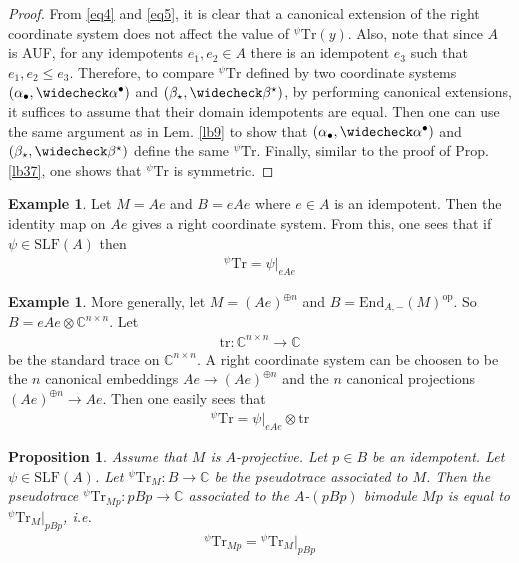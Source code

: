 \documentclass[11pt,b5paper,notitlepage]{article}
\theoremstyle{definition}
\newtheorem{eg}[df]{Example}
\theoremstyle{plain}
\newtheorem{pp}[df]{Proposition}
\newcommand{\wch}{\widecheck}
\newcommand{\Tr}{\mathrm{Tr}}
\newcommand{\End}{\mathrm{End}} %
\newcommand{\opp}{\mathrm{op}}
\newcommand{\blt}{\bullet}
\newcommand{\Cbb}{\mathbb C}
\newcommand{\SLF}{\mathrm{SLF}}
\newcommand{\trc}{\mathrm{tr}}
\numberwithin{equation}{section}
\begin{document}
\begin{proof}
From \eqref{eq4} and \eqref{eq5}, it is clear that a canonical extension of the right coordinate system does not affect the value of ${^\psi}\Tr(y)$. Also, note that since $A$ is AUF, for any idempotents $e_1,e_2\in A$ there is an idempotent $e_3$ such that $e_1,e_2\leq e_3$. Therefore, to compare ${^\psi}\Tr$ defined by two coordinate systems $(\alpha_\blt,\wch\alpha^\blt)$ and $(\beta_\star,\wch\beta^\star)$, by performing canonical extensions, it suffices to assume that their domain idempotents are equal. Then one can use the same argument as in Lem. \ref{lb9} to show that $(\alpha_\blt,\wch\alpha^\blt)$ and $(\beta_\star,\wch\beta^\star)$ define the same ${^\psi}\Tr$. Finally, similar to the proof of Prop. \ref{lb37}, one shows that ${^\psi}\Tr$ is symmetric.
\end{proof}



\begin{eg}
Let $M=Ae$ and $B=eAe$ where $e\in A$ is an idempotent. Then the identity map on $Ae$ gives a right coordinate system. From this, one sees that if $\psi\in\SLF(A)$ then
\begin{align*}
{^\psi}\Tr=\psi|_{eAe}
\end{align*}
\end{eg}


\begin{eg}\label{lb47}
More generally, let $M=(Ae)^{\oplus n}$ and $B=\End_{A,-}(M)^\opp$. So $B=eAe\otimes\Cbb^{n\times n}$. Let
\begin{align*}
\trc:\Cbb^{n\times n}\rightarrow\Cbb
\end{align*}
be the standard trace on $\Cbb^{n\times n}$. A right coordinate system can be choosen to be the $n$ canonical embeddings $Ae\rightarrow (Ae)^{\oplus n}$ and the $n$ canonical projections $(Ae)^{\oplus n}\rightarrow Ae$. Then one easily sees that
\begin{align*}
{^\psi}\Tr=\psi|_{eAe}\otimes\trc
\end{align*}
\end{eg}

\begin{pp}\label{lb40}
	Assume that $M$ is $A$-projective. Let $p\in B$ be an idempotent. Let $\psi\in\SLF(A)$. Let ${}^\psi\Tr_M:B\rightarrow\Cbb$ be the pseudotrace associated to $M$. Then the pseudotrace ${}^\psi\Tr_{Mp}:pBp\rightarrow\Cbb$ associated to the $A$-$(pBp)$ bimodule $Mp$ is equal to ${}^\psi\Tr_M\big|_{pBp}$, i.e.
\begin{align*}
{}^\psi\Tr_{Mp}={}^\psi\Tr_M\big|_{pBp}
\end{align*}
\end{pp}
\end{document}
